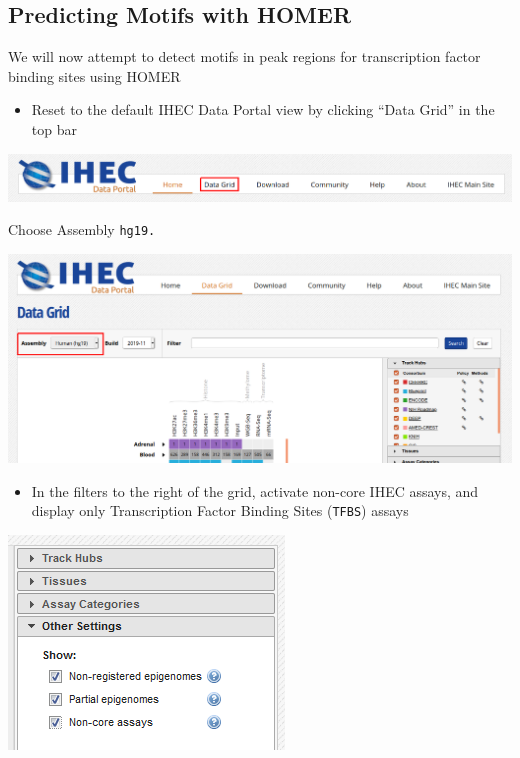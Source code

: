 \documentclass[
]{book}
\providecommand{\tightlist}{%
  \setlength{\itemsep}{0pt}\setlength{\parskip}{0pt}}
\begin{document}
\subsection{Predicting Motifs with HOMER}\label{predicting-motifs-with-homer}

We will now attempt to detect motifs in peak regions for transcription factor binding sites using HOMER

\begin{itemize}
\tightlist
\item
  Reset to the default IHEC Data Portal view by clicking ``Data Grid'' in the top bar
\end{itemize}

\includegraphics{./img/HOMER_selectDataGrid.png}

Choose Assembly \texttt{hg19.}

\includegraphics{./img/HOMER_selecthg19.png}

\begin{itemize}
\tightlist
\item
  In the filters to the right of the grid, activate non-core IHEC assays, and display only Transcription Factor Binding Sites (\texttt{TFBS}) assays
\end{itemize}

\includegraphics{./img/HOMER_showNonCoreAssays.png}
\end{document}
